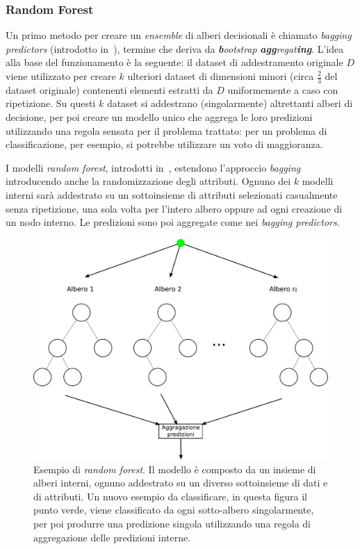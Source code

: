 \subsubsection{Random Forest}
Un primo metodo per creare un \emph{ensemble} di alberi decisionali è chiamato \emph{bagging predictors} (introdotto in~\cite{bagging_predictors}), termine che deriva da \emph{\textbf{b}ootstrap} \emph{\textbf{agg}regat\textbf{ing}}.
L'idea alla base del funzionamento è la seguente: il dataset di addestramento originale $D$ viene utilizzato per creare $k$ ulteriori dataset di dimensioni minori (circa $\frac{2}{3}$ del dataset originale) contenenti elementi estratti da $D$ uniformemente a caso con ripetizione.
Su questi $k$ dataset si addestrano (singolarmente) altrettanti alberi di decisione, per poi creare un modello unico che aggrega le loro predizioni utilizzando una regola sensata per il problema trattato: per un problema di classificazione, per esempio, si potrebbe utilizzare un voto di maggioranza.

I modelli \emph{random forest}, introdotti in~\cite{random_forest}, estendono l'approccio \emph{bagging} introducendo anche la randomizzazione degli attributi. 
Ognuno dei $k$ modelli interni sarà addestrato su un sottoinsieme  di attributi selezionati casualmente senza ripetizione, una sola volta per l'intero albero oppure ad ogni creazione di un nodo interno.
Le predizioni sono poi aggregate come nei \emph{bagging predictors}.

\begin{figure}
    \centering
    \includegraphics[width=0.7\linewidth]{img/random_forest.pdf}
    \caption{Esempio di \emph{random forest}. Il modello è composto da un insieme di alberi interni, ognuno addestrato su un diverso sottoinsieme di dati e di attributi. Un nuovo esempio da classificare, in questa figura il punto verde, viene classificato da ogni sotto-albero singolarmente, per poi produrre una predizione singola utilizzando una regola di aggregazione delle predizioni interne.}
    \label{fig:random_forest}
\end{figure}

